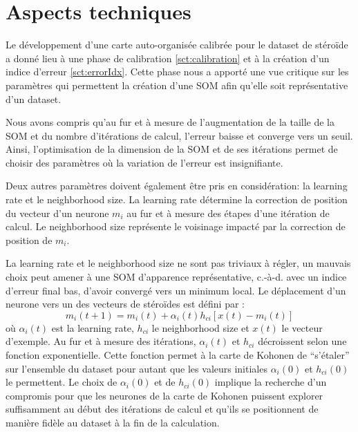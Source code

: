 
\section{Aspects techniques}

	Le développement d'une carte auto-organisée calibrée pour le dataset de stéroïde a donné lieu à une phase de calibration \autoref{sct:calibration} et à la création d'un indice d'erreur \autoref{sct:errorIdx}. Cette phase nous a apporté une vue critique sur les paramètres qui permettent la création d'une SOM afin qu'elle soit représentative d'un dataset. %

	Nous avons compris qu'au fur et à mesure de l'augmentation de la taille de la SOM et du nombre d'itérations de calcul, l'erreur baisse et converge vers un seuil. Ainsi, l'optimisation de la dimension de la SOM et de ses itérations permet de choisir des paramètres où la variation de l'erreur est insignifiante. 

	Deux autres paramètres doivent également être pris en considération: la learning rate et le neighborhood size. La learning rate détermine la correction de position du vecteur d'un neurone $m_i$ au fur et à mesure des étapes d'une itération de calcul. Le neighborhood size représente le voisinage impacté par la correction de position de $m_i$. 

	La learning rate et le neighborhood size ne sont pas triviaux à régler, un mauvais choix peut amener à une SOM d'apparence représentative, c.-à-d. avec un indice d'erreur final bas, d'avoir convergé vers un minimum local. Le déplacement d'un neurone vers un des vecteurs de stéroïdes est défini par : $$m_i(t+1) = m_i(t)+\alpha_i(t)h_{ci}[x(t) - m_i(t)]$$ où $\alpha_i(t)$ est la learning rate, $h_{ci}$ le neighborhood size et $x(t)$ le vecteur d'exemple. Au fur et à mesure des itérations, $\alpha_i(t)$ et $h_{ci}$ décroissent selon une fonction exponentielle. Cette fonction permet à la carte de Kohonen de ``s'étaler'' sur l'ensemble du dataset pour autant que les valeurs initiales $\alpha_i(0)$ et $h_{ci}(0)$ le permettent. Le choix de $\alpha_i(0)$ et de $h_{ci}(0)$ implique la recherche d'un compromis pour que les neurones de la carte de Kohonen puissent explorer suffisamment au début des itérations de calcul et qu'ils se positionnent de manière fidèle au dataset à la fin de la calculation.

